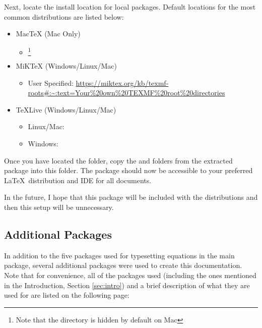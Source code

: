 Next, locate the install location for local packages. Default locations for the most common distributions are listed below:
\begin{itemize}
    \item MacTeX (Mac Only)
        \begin{itemize}
            \item {}\footnote{Note that the  directory is hidden by default on Mac} 
        \end{itemize}
    \item MiKTeX (Windows/Linux/Mac) 
        \begin{itemize}
            \item User Specified: \url{https://miktex.org/kb/texmf-roots#:~:text=Your%20own%20TEXMF%20root%20directories}
        \end{itemize}
    \item TeXLive (Windows/Linux/Mac) 
        \begin{itemize}
            \item Linux/Mac: 
            \item Windows: 
        \end{itemize}
\end{itemize}

Once you have located the folder, copy the  and  folders from the extracted package into this folder. The package should now be accessible to your preferred \LaTeX\ distribution and IDE for all documents.

In the future, I hope that this package will be included with the distributions and then this setup will be unnecessary.

\subsection{Additional Packages}
\label{sec:addpacks}
In addition to the five packages used for typesetting equations in the main package, several additional packages were used to create this documentation. Note that for convenience, all of the packages used (including the ones mentioned in the Introduction, Section \ref{sec:intro}) and a brief description of what they are used for are listed on the following page:

